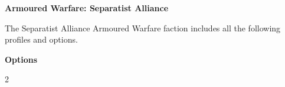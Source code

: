 \documentclass{article}
\begin{document}
{\Huge \textbf{Armoured Warfare: Separatist Alliance}}
\vspace{0.6cm}

\begin{minipage}{19cm}
    The Separatist Alliance Armoured Warfare faction includes all the following profiles and options.
\end{minipage}

\vspace{0.3cm}
{\scriptsize

\setlength\extrarowheight{1.5pt}


}
\vspace{0.6cm}

{\Large \textbf{Options}}
\begin{multicols}{2}

{\scriptsize

% 

}
\end{multicols}
\end{document}
